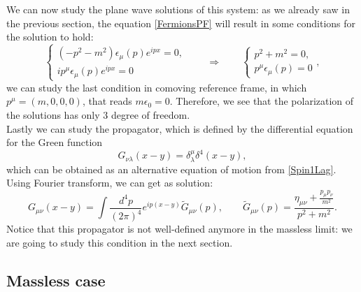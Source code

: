We can now study the plane wave solutions of this system: as we already saw in the previous section, the equation \eqref{FermionsPF} will result in some conditions for the solution to hold:
\begin{equation*}
    \begin{cases}
        (-p^2-m^2)\epsilon_\mu(p)e^{ipx}=0,\\
         ip^\mu\epsilon_\mu(p)e^{ipx}=0
    \end{cases}\qquad\Rightarrow\qquad
    \begin{cases}
        p^2+m^2=0,\\
        p^\mu\epsilon_\mu(p)=0
    \end{cases},
\end{equation*}
we can study the last condition in comoving reference frame, in which $p^\mu=(m,0,0,0)$, that reads $m\epsilon_0=0$. Therefore, we see that the polarization of the solutions has only 3 degree of freedom.\\

Lastly we can study the propagator, which is defined by the differential equation for the Green function
\begin{equation*}
    [(-\Box+m^2)\eta^{\mu\nu}+\partial^\mu\partial^\nu]G_{\nu\lambda}(x-y)=\delta^{\mu}_\lambda\delta^4(x-y),
\end{equation*}
which can be obtained as an alternative equation of motion from \eqref{Spin1Lag}.\\
Using Fourier transform, we can get as solution:
\begin{equation*}
    G_{\mu\nu}(x-y)=\int\frac{d^4p}{(2\pi)^4}e^{ip(x-y)}\tilde{G}_{\mu\nu}(p),\qquad\tilde{G}_{\mu\nu}(p)=\frac{\eta_{\mu\nu}+\frac{p_\mu p_\nu}{m^2}}{p^2+m^2}.
\end{equation*}
Notice that this propagator is not well-defined anymore in the massless limit: we are going to study this condition in the next section.
\subsection{Massless case}


